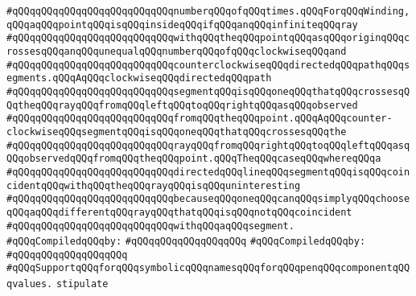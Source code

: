 \verb|#qQQqqQQqqQQqqQQqqQQqqQQqqQQqnumberqQQqofqQQqtimes.qQQqForqQQqWinding,qQQqaqQQqpointqQQqisqQQqinsideqQQqifqQQqanqQQqinfiniteqQQqray|\newline
\verb|#qQQqqQQqqQQqqQQqqQQqqQQqqQQqwithqQQqtheqQQqpointqQQqasqQQqoriginqQQqcrossesqQQqanqQQqunequalqQQqnumberqQQqofqQQqclockwiseqQQqand|\newline
\verb|#qQQqqQQqqQQqqQQqqQQqqQQqqQQqcounterclockwiseqQQqdirectedqQQqpathqQQqsegments.qQQqAqQQqclockwiseqQQqdirectedqQQqpath|\newline
\verb|#qQQqqQQqqQQqqQQqqQQqqQQqqQQqsegmentqQQqisqQQqoneqQQqthatqQQqcrossesqQQqtheqQQqrayqQQqfromqQQqleftqQQqtoqQQqrightqQQqasqQQqobserved|\newline
\verb|#qQQqqQQqqQQqqQQqqQQqqQQqqQQqfromqQQqtheqQQqpoint.qQQqAqQQqcounter-clockwiseqQQqsegmentqQQqisqQQqoneqQQqthatqQQqcrossesqQQqthe|\newline
\verb|#qQQqqQQqqQQqqQQqqQQqqQQqqQQqrayqQQqfromqQQqrightqQQqtoqQQqleftqQQqasqQQqobservedqQQqfromqQQqtheqQQqpoint.qQQqTheqQQqcaseqQQqwhereqQQqa|\newline
\verb|#qQQqqQQqqQQqqQQqqQQqqQQqqQQqdirectedqQQqlineqQQqsegmentqQQqisqQQqcoincidentqQQqwithqQQqtheqQQqrayqQQqisqQQquninteresting|\newline
\verb|#qQQqqQQqqQQqqQQqqQQqqQQqqQQqbecauseqQQqoneqQQqcanqQQqsimplyqQQqchooseqQQqaqQQqdifferentqQQqrayqQQqthatqQQqisqQQqnotqQQqcoincident|\newline
\verb|#qQQqqQQqqQQqqQQqqQQqqQQqqQQqwithqQQqaqQQqsegment.|\newline
\newline
\verb|#qQQqCompiledqQQqby:|\newline
\verb|#qQQqqQQqqQQqqQQqqQQq|\newline
\newline
\newline
\verb|#qQQqCompiledqQQqby:|\newline
\verb|#qQQqqQQqqQQqqQQqqQQq|\newline
\newline
\newline
\newline
\verb|#qQQqSupportqQQqforqQQqsymbolicqQQqnamesqQQqforqQQqpenqQQqcomponentqQQqvalues.|\newline
\newline
\verb|stipulate|\newline
